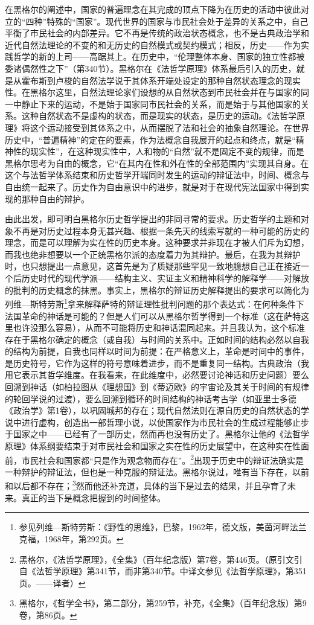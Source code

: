 在黑格尔的阐述中，国家的普遍理念在其完成的顶点下降为在历史的活动中彼此对立的“四种”特殊的“国家”。现代世界的国家与市民社会处于差异的关系之中，自己平衡了市民社会的内部差异。它不再是传统的政治状态概念，也不是古典政治学和近代自然法理论的不变的和无历史的自然模式或契约模式；相反，历史——作为实践哲学的新的上司——高踞其上。在历史中，“伦理整体本身、国家的独立性都被委诸偶然性之下”（第340节）。黑格尔在《法哲学原理》体系最后引入的历史，就是从霍布斯到卢梭的自然法学说于其体系开端处设定的那种自然状态理念的现实性。在黑格尔这里，自然法理论家们设想的从自然状态到市民社会并在与国家的同一中静止下来的运动，不是始于国家同市民社会的关系，而是始于与其他国家的关系。这种自然状态不是虚构的状态，而是现实的状态，是历史的运动。《法哲学原理》将这个运动接受到其体系之中，从而摆脱了法和社会的抽象自然理论。在世界历史中，“普遍精神”的定在的要素，作为法概念自我展开的起点和终点，就是“精神性的现实性”，在这种现实性中，人和物的“自然”就不是固定不变的规律，而是黑格尔思考为自由的概念，它“在其内在性和外在性的全部范围内”实现其自身。在这个与法哲学体系结束和历史哲学开端同时发生的运动的辩证法中，时间、概念与自由统一起来了。历史作为自由意识中的进步，就是对于在现代宪法国家中得到实现的那种自由的辩护。

由此出发，即可明白黑格尔历史哲学提出的非同寻常的要求。历史哲学的主题和对象不再是对历史过程本身无甚兴趣、根据一条先天的线索写就的一种可能的历史的理念，而是可以理解为实在性的历史本身。这种要求并非现在才被人们斥为幻想，而我也绝非想要以一个正统黑格尔派的态度着力为其辩护。最后，在我为其辩护时，也只想提出一点意见，这首先是为了质疑那些罕见一致地臆想自己正在接近一个后历史时代的现代学派——结构主义、实证主义和精神科学的解释学——对解放的批判的历史概念的抹黑。事实上，黑格尔的辩证历史解释提出的要求可以简化为列维—斯特劳斯\footnote{参见列维—斯特劳斯：《野性的思维》，巴黎，1962年，德文版，美茵河畔法兰克福，1968年，第292页。}拿来解释萨特的辩证理性批判问题的那个表达式：在何种条件下法国革命的神话是可能的？但是人们可以从黑格尔哲学得到一个标准（这在萨特这里也许没那么容易），从而不可能将历史和神话混同起来。并且我认为，这个标准存在于黑格尔确定的概念（或自我）与时间的关系中。正如时间的结构必然以自我的结构为前提，自我也同样以时间为前提：在严格意义上，革命是时间中的事件，是历史符号，它作为这样的符号意味着进步，而不是重复同一结构。古典政治（我用它表示其哲学维度。在我看来，在此维度中，必然要讨论神话和历史问题）要么回溯到神话（如柏拉图从《理想国》到《蒂迈欧》的宇宙论及其关于时间的有规律的轮回学说的过渡），要么回溯到循环的时间结构的神话考古学（如亚里士多德《政治学》第1卷），以巩固城邦的存在；现代自然法则在源自历史的自然状态的学说中进行虚构，创造出一部哲理小说，以使国家作为市民社会的生成过程能够止步于国家之中——已经有了一部历史，然而再也没有历史了。黑格尔让他的《法哲学原理》体系纲要结束于对市民社会和国家之实在性的历史展望中，在这种实在性面前，市民社会和国家都“只是作为观念物而存在”。\footnote{黑格尔，《法哲学原理》，《全集》（百年纪念版）第7卷，第446页。（原引文引自《法哲学原理》第341节，而非第340节。中译文参见《法哲学原理》，第351页。——译者）}出现于历史中的辩证法确实是一种辩护的辩证法，但也是一种克服的辩证法。黑格尔说过，唯有当下存在，以前和以后都不存在；\footnote{黑格尔，《哲学全书》，第二部分，第259节，补充，《全集》（百年纪念版）第9卷，第86页。}然而他还补充道，具体的当下是过去的结果，并且孕育了未来。真正的当下是概念把握到的时间整体。
